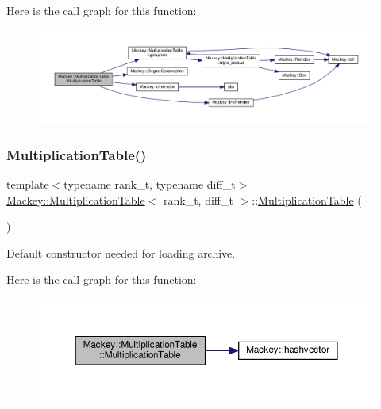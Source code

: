 Here is the call graph for this function\+:\nopagebreak
\begin{figure}[H]
\begin{center}
\leavevmode
\includegraphics[width=350pt]{classMackey_1_1MultiplicationTable_a8530e27d8d2c3c755eb5041a2ee8c35b_cgraph}
\end{center}
\end{figure}
\mbox{\label{classMackey_1_1MultiplicationTable_ac3bc2d09599a994b2b159def52484bae}} 
\subsubsection{\texorpdfstring{Multiplication\+Table()}{MultiplicationTable()}\hspace{0.1cm}{\footnotesize\ttfamily [2/2]}}
{\footnotesize\ttfamily template$<$typename rank\+\_\+t, typename diff\+\_\+t$>$ \\
\hyperlink{classMackey_1_1MultiplicationTable}{Mackey\+::\+Multiplication\+Table}$<$ rank\+\_\+t, diff\+\_\+t $>$\+::\hyperlink{classMackey_1_1MultiplicationTable}{Multiplication\+Table} (\begin{DoxyParamCaption}{ }\end{DoxyParamCaption})\hspace{0.3cm}{\ttfamily [inline]}}



Default constructor needed for loading archive. 

Here is the call graph for this function\+:\nopagebreak
\begin{figure}[H]
\begin{center}
\leavevmode
\includegraphics[width=350pt]{classMackey_1_1MultiplicationTable_ac3bc2d09599a994b2b159def52484bae_cgraph}
\end{center}
\end{figure}


